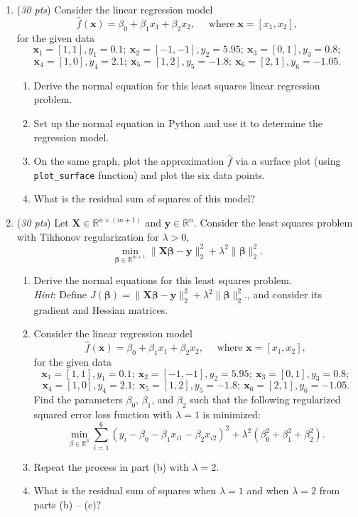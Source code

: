 \documentclass[10pt,twoside]{article}
\renewcommand{\vec}[1]{\mathbf{#1}}
\newcommand{\mat}[1]{\mathbf{#1}}
\begin{document}
\begin{enumerate}
\item (\emph{30 pts}) Consider the linear regression model 
\[
\hat{f}(\vec{x}) = \beta_0+\beta_1 x_1 + \beta_2 x_2, \quad \mbox{ where } \vec{x} = [x_1, x_2],
\]
for the given data 
\[
\vec{x}_1 = [1, 1], y_1 = 0.1;~ 
\vec{x}_2 = [-1,-1], y_2 = 5.95; ~
\vec{x}_3 = [0,1], y_3 = 0.8; \]
\[
\vec{x}_4 = [1, 0], y_4 = 2.1; ~
\vec{x}_5 = [1,2], y_5 = -1.8; ~
\vec{x}_6 = [2,1], y_6 = -1.05.
\]
\begin{enumerate}
\item Derive the normal equation for this least squares linear regression problem.
\item Set up the normal equation in Python and use it to determine the regression model.
\item On the same graph, plot the approximation $\hat{f}$ via a surface plot (using \texttt{plot\_surface} function) and plot the six data points. 
\item What is the residual sum of squares of this model?
\end{enumerate}

\newpage
\item (\emph{30 pts}) 
Let $\mat{X} \in \mathbb{R}^{n\times (m+1)}$ and $\vec{y}\in \mathbb{R}^{n}$. Consider the least squares problem with Tikhonov regularization for $\lambda > 0$,
\[ \min_{\vec{\beta}\in \mathbb{R}^{m+1}} \|\mat{X}\vec{\beta}-\vec{y}\|_2^2 + \lambda^2 \|\vec{\beta}\|_2^2. \] 
\begin{enumerate}
\item Derive the normal equations for this least squares problem.\\
{\em Hint}: Define $J(\vec{\beta})= \|\mat{X}\vec{\beta}-\vec{y}\|_2^2 + \lambda^2 \|\vec{\beta}\|_2^2.$, and consider its gradient and Hessian matrices.
\item Consider the linear regression model 
\[
\hat{f}(\vec{x}) =\beta_0+ \beta_1 x_1 + \beta_2 x_2, \quad \mbox{ where } \vec{x} = [x_1, x_2],
\]
for the given data 
\[
\vec{x}_1 = [1, 1], y_1 = 0.1;~ 
\vec{x}_2 = [-1,-1], y_2 = 5.95; ~
\vec{x}_3 = [0,1], y_3 = 0.8; \]
\[
\vec{x}_4 = [1, 0], y_4 = 2.1; ~
\vec{x}_5 = [1,2], y_5 = -1.8; ~
\vec{x}_6 = [2,1], y_6 = -1.05.
\]
Find the parameters $\beta_0$, $\beta_1$, and $\beta_2$ such that the following regularized squared error loss function with $\lambda = 1$ is minimized:
\[
\min_{\beta\in \mathbb{R}^3} \sum_{i=1}^6 \left(y_i- \beta_0 - \beta_{1}x_{i1} - \beta_{2}x_{i2}\right)^2 + \lambda^2(\beta_0^2 + \beta_1^2 + \beta_2^2).
\]
\item Repeat the process in part (b) with $\lambda = 2$.
\item What is the residual sum of squares when $\lambda = 1$ and when $\lambda=2$ from parts (b) -- (c)?
\end{enumerate}

\end{enumerate}

\end{document}
